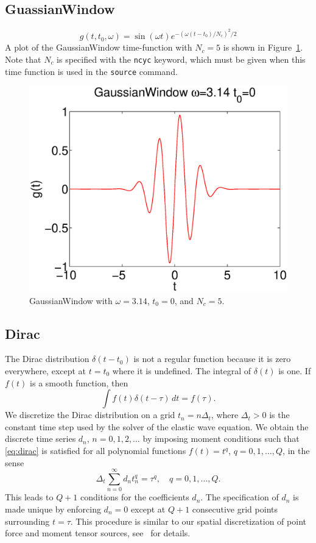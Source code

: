 \documentclass[11pt]{report}
\begin{document}
\subsection{GuassianWindow}
\[
g(t,t_0,\omega) = \sin(\omega t) e^{-(\omega(t-t_0)/N_c)^2/2}
\]
A plot of the GaussianWindow time-function with $N_c=5$ is shown in
Figure~\ref{fig:gaussianwindow}. Note that $N_c$ is specified with the \verb+ncyc+ keyword, which
must be given when this time function is used in the \verb+source+ command.
\begin{figure}
\begin{centering}
  \includegraphics[width=0.6\linewidth]{GW.eps}
  \caption{GaussianWindow with $\omega=3.14$, $t_0=0$, and $N_c=5$.}
  \label{fig:gaussianwindow}
\end{centering}
\end{figure}  

\subsection{Dirac}
The Dirac distribution $\delta(t-t_0)$ is not a regular function because it is zero everywhere,
except at $t=t_0$ where it is undefined. The integral of $\delta(t)$ is one. If $f(t)$ is a smooth
function, then
\begin{equation}\label{eq:dirac}
\int f(t)\delta(t-\tau)\, dt = f(\tau).
\end{equation}
We discretize the Dirac distribution on a grid $t_n = n\Delta_t$, where $\Delta_t>0$ is the constant
time step used by the solver of the elastic wave equation. We obtain the discrete time series $d_n$,
$n=0,1,2,\ldots$ by imposing moment conditions such that \eqref{eq:dirac} is satisfied for all
polynomial functions $f(t)=t^q$, $q=0,1,\ldots,Q$, in the sense
\[
\Delta_t \sum_{n=0}^\infty d_n t_n^q = \tau^q,\quad q=0,1,\ldots,Q. 
\]
This leads to $Q+1$ conditions for the coefficients $d_n$. The specification of $d_n$ is made unique
by enforcing $d_n=0$ except at $Q+1$ consecutive grid points surrounding $t=\tau$. This procedure is
similar to our spatial discretization of point force and moment tensor sources, see~\cite{PetSjo-10}
for details.
\end{document}
